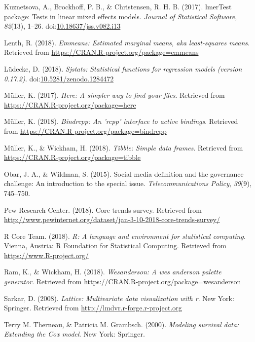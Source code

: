 \documentclass[man]{apa6}
\theoremstyle{definition}
\theoremstyle{definition}
\theoremstyle{definition}
\theoremstyle{remark}
\begin{document}
\hypertarget{ref-R-lmerTest}{}
Kuznetsova, A., Brockhoff, P. B., \& Christensen, R. H. B. (2017).
lmerTest package: Tests in linear mixed effects models. \emph{Journal of
Statistical Software}, \emph{82}(13), 1--26.
doi:\href{https://doi.org/10.18637/jss.v082.i13}{10.18637/jss.v082.i13}

\hypertarget{ref-R-emmeans}{}
Lenth, R. (2018). \emph{Emmeans: Estimated marginal means, aka
least-squares means}. Retrieved from
\url{https://CRAN.R-project.org/package=emmeans}

\hypertarget{ref-R-sjstats}{}
Lüdecke, D. (2018). \emph{Sjstats: Statistical functions for regression
models (version 0.17.2)}.
doi:\href{https://doi.org/10.5281/zenodo.1284472}{10.5281/zenodo.1284472}

\hypertarget{ref-R-here}{}
Müller, K. (2017). \emph{Here: A simpler way to find your files}.
Retrieved from \url{https://CRAN.R-project.org/package=here}

\hypertarget{ref-R-bindrcpp}{}
Müller, K. (2018). \emph{Bindrcpp: An 'rcpp' interface to active
bindings}. Retrieved from
\url{https://CRAN.R-project.org/package=bindrcpp}

\hypertarget{ref-R-tibble}{}
Müller, K., \& Wickham, H. (2018). \emph{Tibble: Simple data frames}.
Retrieved from \url{https://CRAN.R-project.org/package=tibble}

\hypertarget{ref-Obar2015}{}
Obar, J. A., \& Wildman, S. (2015). Social media definition and the
governance challenge: An introduction to the special issue.
\emph{Telecommunications Policy}, \emph{39}(9), 745--750.

\hypertarget{ref-Pew}{}
Pew Research Center. (2018). Core trends survey. Retrieved from
\url{http://www.pewinternet.org/dataset/jan-3-10-2018-core-trends-survey/}

\hypertarget{ref-R-base}{}
R Core Team. (2018). \emph{R: A language and environment for statistical
computing}. Vienna, Austria: R Foundation for Statistical Computing.
Retrieved from \url{https://www.R-project.org/}

\hypertarget{ref-R-wesanderson}{}
Ram, K., \& Wickham, H. (2018). \emph{Wesanderson: A wes anderson
palette generator}. Retrieved from
\url{https://CRAN.R-project.org/package=wesanderson}

\hypertarget{ref-R-lattice}{}
Sarkar, D. (2008). \emph{Lattice: Multivariate data visualization with
r}. New York: Springer. Retrieved from
\url{http://lmdvr.r-forge.r-project.org}

\hypertarget{ref-R-survival-book}{}
Terry M. Therneau, \& Patricia M. Grambsch. (2000). \emph{Modeling
survival data: Extending the Cox model}. New York: Springer.
\end{document}
